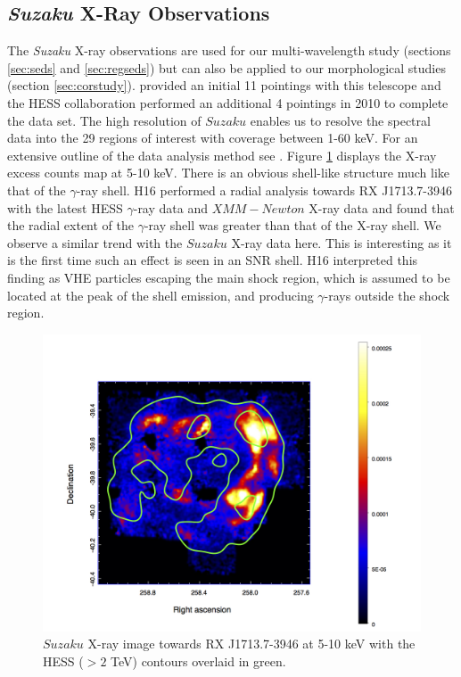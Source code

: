 \documentclass[12pt,a4paper]{article}
\begin{document}
\subsection{\textbf{\textit{Suzaku}} X-Ray Observations}
The \textit{Suzaku} X-ray observations are used for our multi-wavelength study (sections \ref{sec:seds} and \ref{sec:regseds}) but can also be applied to our morphological studies (section \ref{sec:corstudy}). \cite{2008ApJ...685..988T} provided an initial 11 pointings with this telescope and the HESS collaboration performed an additional 4 pointings in 2010 to complete the data set. The high resolution of $\mathit{Suzaku}$ enables us to resolve the spectral data into the 29 regions of interest with coverage between 1-60 keV. For an extensive outline of the data analysis method see \cite{2008ApJ...685..988T}. Figure \ref{fig:suzakumap} displays the X-ray excess counts map at 5-10 keV. There is an obvious shell-like structure much like that of the $\gamma$-ray shell. H16 performed a radial analysis towards RX J1713.7-3946 with the latest HESS $\gamma$-ray data and $\mathit{XMM-Newton}$ X-ray data and found that the radial extent of the $\gamma$-ray shell was greater than that of the X-ray shell. We observe a similar trend with the $\mathit{Suzaku}$ X-ray data here. This is interesting as it is the first time such an effect is seen in an SNR shell. H16 interpreted this finding as VHE particles escaping the main shock region, which is assumed to be located at the peak of the shell emission, and producing $\gamma$-rays outside the shock region. 
\begin{figure}[H]
	\centering
	\includegraphics[width=0.75\linewidth, height=0.36\textheight]{suzaku_map}
	\caption{$\mathit{Suzaku}$ X-ray image towards RX J1713.7-3946 at 5-10 keV with the HESS ($>2$ TeV) contours overlaid in green.}
	\label{fig:suzakumap}
\end{figure}
\end{document}
